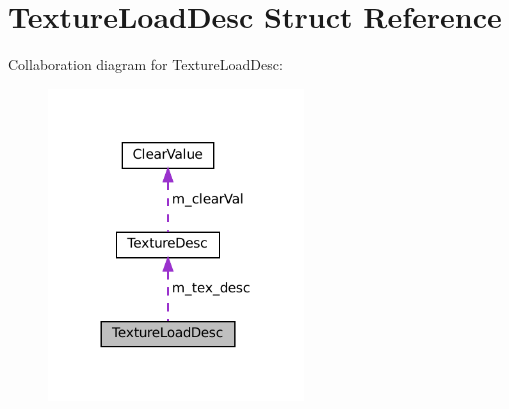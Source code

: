 \hypertarget{structTextureLoadDesc}{}\section{Texture\+Load\+Desc Struct Reference}
\label{structTextureLoadDesc}


Collaboration diagram for Texture\+Load\+Desc\+:\nopagebreak
\begin{figure}[H]
\begin{center}
\leavevmode
\includegraphics[width=192pt]{structTextureLoadDesc__coll__graph}
\end{center}
\end{figure}
